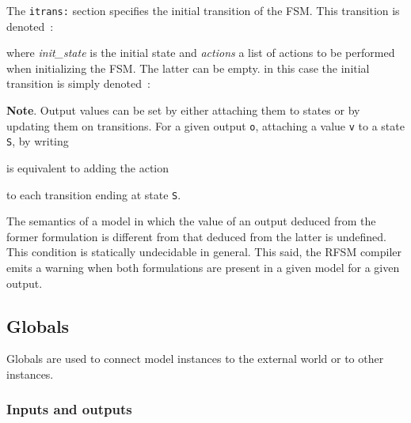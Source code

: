 The \verb|itrans:| section specifies the initial transition of the FSM. This transition is denoted~:

\begin{center}
\end{center}

where \emph{init\_state} is the initial state and \emph{actions} a list of actions to be performed
when initializing the FSM. The latter can be empty. in this case the initial transition is simply
denoted~:

\begin{center}
\end{center}

\medskip
\textbf{Note}. Output values can be set by either attaching them to states or by updating them on
transitions. For a given output \texttt{o}, attaching a value \texttt{v} to a state \texttt{S}, by writing

\begin{center}
\end{center}

is equivalent to adding the action

\begin{center}
\end{center}

to each transition ending at state \texttt{S}.

The semantics of a model in which the value of an output deduced from the former formulation is
different from that deduced from the latter is undefined. This condition is statically
undecidable in general. This said, the RFSM compiler emits a warning when both formulations are
present in a given model for a given output.

\subsection{Globals}
\label{sec:globals}

Globals are used to connect model instances to the external world or to other instances.

\subsubsection*{Inputs and outputs}
\label{sec:inputs-outputs}

